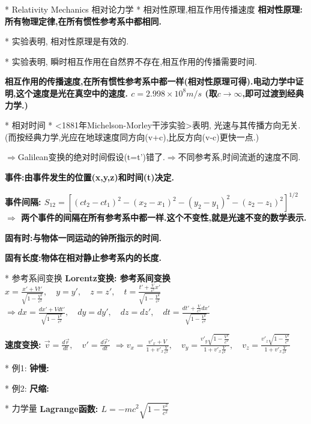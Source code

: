 * Relativity Mechanics 相对论力学
    * 相对性原理,相互作用传播速度
        \bf{相对性原理}: 所有物理定律,在所有惯性参考系中都相同.
        
        * 实验表明, 相对性原理是有效的.
        
        * 实验表明, 瞬时相互作用在自然界不存在,相互作用的传播需要时间.
        
        \bf{相互作用的传播速度},在所有惯性参考系中都一样(相对性原理可得).\quad 电动力学中证明,这个速度是光在真空中的速度.
            $c = 2.998 \times 10^8 m/s$
            (取$c\to \infty$,即可过渡到经典力学.)


    * 相对时间
        * <1881年Michelson-Morley干涉实验>表明, 光速与其传播方向无关. (而按经典力学,光应在地球速度同方向(v+c),比反方向(v-c)更快一点.)
        
        $\Rightarrow$Galilean变换的绝对时间假设(t=t')错了.\quad  $\Rightarrow$不同参考系,时间流逝的速度不同.
        
        \bf{事件}:由事件发生的位置(x,y,z)和时间(t)决定.
        
        \bf{事件间隔}:
            $S_{12} = [(ct_2-ct_1)^2 - (x_2-x_1)^2 - (y_2-y_1)^2 - (z_2-z_1)^2]^{1/2}$
            $\Rightarrow$ 两个事件的间隔在所有参考系中都一样.\quad 这个不变性,就是光速不变的数学表示.
        
        \bf{固有时}:与物体一同运动的钟所指示的时间.
        
        \bf{固有长度}:物体在相对静止参考系内的长度.


    * 参考系间变换
        \bf{Lorentz变换}: 参考系间变换
            $ x = \frac{x' + V t'}{\sqrt{1 - \frac{V^2}{c^2}}},\quad y=y',\quad z=z', \quad t = \frac{t'+ \frac{V}{c^2}x'}{\sqrt{1 - \frac{V^2}{c^2}}}$
            $ \Rightarrow dx = \frac{dx' + V dt'}{\sqrt{1 - \frac{V^2}{c^2}}},\quad dy=dy',\quad dz=dz', \quad dt = \frac{dt'+ \frac{V}{c^2}dx'}{\sqrt{1 - \frac{V^2}{c^2}}}$
    
        \bf{速度变换}: $\vec v = \frac{d\vec r}{dt},\quad v' = \frac{d\vec r'}{dt}$
            $\Rightarrow v_x = \frac{v'_x + V}{1 + v'_x \frac{V}{c^2}}, \quad v_y = \frac{v'_y \sqrt{1 - \frac{V^2}{c^2}}}{1 + v'_x \frac{V}{c^2}},\quad v_z = \frac{v'_z \sqrt{1 - \frac{V^2}{c^2}}}{1 + v'_x \frac{V}{c^2}}$
            
        * 例1: \bf{钟慢}:
    
        * 例2: \bf{尺缩}:


    * 力学量
        \bf{Lagrange函数}:
            $L = -m c^2 \sqrt{1 - \frac{v^2}{c^2}}$
    
